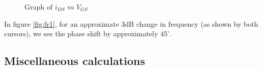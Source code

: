 \documentclass{report}[12pt]
\begin{document}
\begin{figure}[ht]
    \centering
    \caption{Graph of $i_{DS}$ vs $V_{GS}$}
    \label{fig:i_vs_vgs}
\end{figure}

In figure \hyperref[fig:fr1]{\ref{fig:fr1}}, for an approximate 3dB change in frequency (as shown by both cursors), we see the phase shift by approximately $45^{\circ}$.

\newpage
\subsection*{Miscellaneous calculations}
\end{document}
